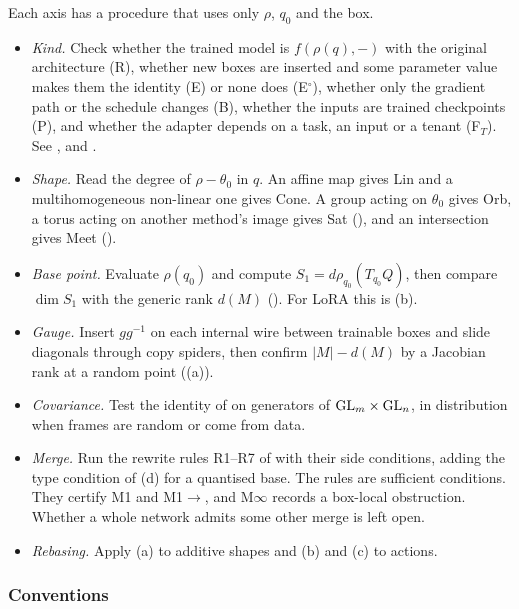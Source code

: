 Each axis has a procedure that uses only $\rho$, $q_0$ and the box.
\begin{itemize}
  \item \emph{Kind.} Check whether the trained model is $f(\rho(q),-)$ with the original architecture (R), whether new
  boxes are inserted and some parameter value makes them the identity (E) or none does (E$^\circ$), whether only the
  gradient path or the schedule changes (B), whether the inputs are trained checkpoints (P), and whether the adapter
  depends on a task, an input or a tenant (F$_T$). See ,  and
  .
  \item \emph{Shape.} Read the degree of $\rho-\theta_0$ in $q$. An affine map gives Lin and a multihomogeneous
  non-linear one gives Cone. A group acting on $\theta_0$ gives Orb, a torus acting on another method's image gives Sat
  (), and an intersection gives Meet ().
  \item \emph{Base point.} Evaluate $\rho(q_0)$ and compute $S_1=d\rho_{q_0}(T_{q_0}Q)$, then compare $\dim S_1$ with
  the generic rank $d(M)$ (). For LoRA this is (b).
  \item \emph{Gauge.} Insert $gg^{-1}$ on each internal wire between trainable boxes and slide diagonals through copy
  spiders, then confirm $\lvert M\rvert-d(M)$ by a Jacobian rank at a random point
  ((a)).
  \item \emph{Covariance.} Test the identity of  on generators of $\mathrm{GL}_m\times\mathrm{GL}_n$, in
  distribution when frames are random or come from data.
  \item \emph{Merge.} Run the rewrite rules R1--R7 of  with their side conditions, adding the type
  condition of (d) for a quantised base. The rules are sufficient conditions. They certify M1
  and M1$\to$, and M$\infty$ records a box-local obstruction. Whether a whole network admits some other merge is left
  open.
  \item \emph{Rebasing.} Apply (a) to additive shapes and (b) and (c) to
  actions.
\end{itemize}

\subsubsection{Conventions}\label{sec:atlas-conventions}

